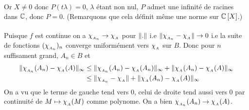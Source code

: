 \documentclass[letterpaper,10pt]{article}
\begin{document}
{Or $X \neq 0$ donc $P(t\lambda) =0$, $\lambda$ étant non nul, $P$ admet une infinité de racines dans $\mathbb{C}$, donc $P=0$. (Remarquons que cela définit même une norme sur $\mathbb{C}\left[X\right] $.)\\
\\
Puisque $f$ est continue on a $\chi_{_{A_n}} \to \chi_{_{A}}$ pour $\|.\|$ i.e $\|\chi_{_{A_n}}-\chi_{_{A}}\| \to 0$ i.e la suite de fonctions $(\chi_{_{A_n}})_n$ converge uniformément vers $\chi_{_{A}}$ sur $B$. Donc pour $n$ suffisament grand, $A_n\in B $ et \begin{align*}\|\chi_{_{A_n}}(A_n)-\chi_{_{A}}(A)\|_{\infty} &\leq \|\chi_{_{A_n}}(A_n)-\chi_{_{A}}(A_n)\|_{\infty} + \|\chi_{_{A}}(A_n)-\chi_{_{A}}(A)\|_{\infty}\\ &\leq \|\chi_{_{A_n}}-\chi_{_{A}}\| + \|\chi_{_{A}}(A_n)-\chi_{_{A}}(A)\|_{\infty} \end{align*}
On a vu que le terme de gauche tend vers 0, celui de droite tend aussi vers 0 par continuité de $M\mapsto \chi_{_{A}}(M)$ comme polynome.
On a bien $\chi_{_{A_n}}(A_n) \to \chi_{_{A}}(A)$. 
}


\printbibliography %
\end{document}
